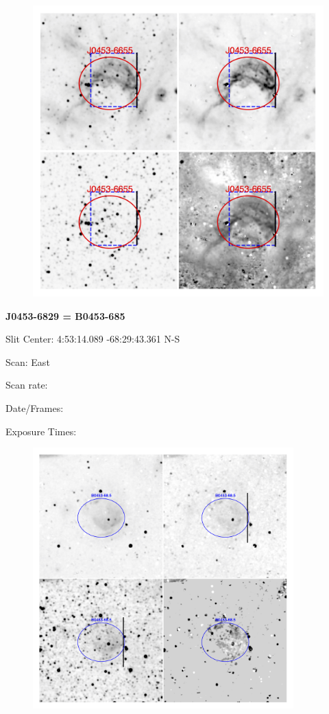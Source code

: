 \documentclass[11pt]{article}
\begin{document}
\begin{figure}
\includegraphics[width=12.5cm]{snapshots/J0453-6655a.png}
\end{figure}

\newpage
{\bf J0453-6829 = B0453-685}

Slit Center:   4:53:14.089    -68:29:43.361     N-S

Scan:  East

Scan rate:  

Date/Frames:

Exposure Times:  

\begin{figure}
\includegraphics[width=10.05cm]{snapshots/B0453-685.png}
\end{figure}
\end{document}

